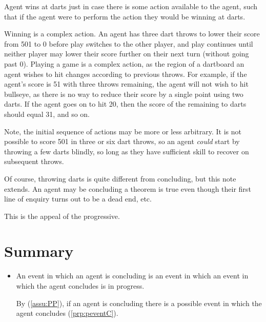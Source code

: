 \begin{note}
  \begin{illustration}[Darts]
    Agent wins at darts just in case there is some action available to the agent, such that if the agent were to perform the action they would be winning at darts.

    Winning is a complex action.
    An agent has three dart throws to lower their score from 501 to 0 before play switches to the other player, and play continues until neither player may lower their score further on their next turn (without going past 0).
    Playing a game is a complex action, as the region of a dartboard an agent wishes to hit changes according to previous throws.
    For example, if the agent's score is 51 with three throws remaining, the agent will not wish to hit bullseye, as there is no way to reduce their score by a single point using two darts.
    If the agent goes on to hit 20, then the score of the remaining to darts should equal 31, and so on.
  \end{illustration}

  Note, the initial sequence of actions may be more or less arbitrary.
  It is not possible to score 501 in three or six dart throws, so an agent \emph{could} start by throwing a few darts blindly, so long as they have sufficient skill to recover on subsequent throws.

  Of course, throwing darts is quite different from concluding, but this note extends.
  An agent may be concluding a theorem is true even though their first line of enquiry turns out to be a dead end, etc.

  This is the appeal of the progressive.
\end{note}





\section*{Summary}
\label{sec:summary}


\begin{note}
  \begin{itemize}
  \item
    An event in which an agent is concluding is an event in which an event in which the agent concludes is in progress.

    By \assuPP{} (\autoref{assu:PP}), if an agent is concluding there is a possible event in which the agent concludes (\autoref{prp:peventC}).

  \end{itemize}
\end{note}



